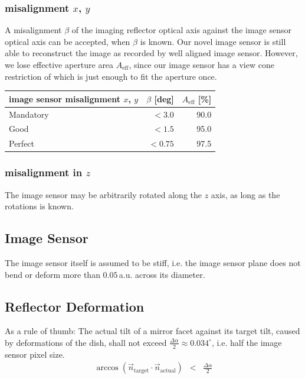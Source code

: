\documentclass[11pt,a4paper,oneside,titlepage]{article}
\begin{document}
\subsubsection{misalignment $x$, $y$}
%
A misalignment $\beta$ of the imaging reflector optical axis against the image sensor optical axis can be accepted, when $\beta$ is known.
%
Our novel image sensor is still able to reconstruct the image as recorded by well aligned image sensor.
%
However, we lose effective aperture area $A_\text{eff}$, since our image sensor has a view cone restriction of which is just enough to fit the aperture once.
%
%
\begin{table}[H]
    \begin{center}
        \begin{tabular}{lrr}
            image sensor misalignment $x$, $y$ & $\beta$ [deg] & $A_\text{eff}$ [\%]\\
            \toprule
            Mandatory & $< 3.0$ & 90.0\\
            Good      & $< 1.5$ & 95.0\\
            Perfect   & $< 0.75$ & 97.5\\
            \bottomrule
        \end{tabular}
    \end{center}
\end{table}
\subsubsection{misalignment in $z$}
%
The image sensor may be arbitrarily rotated along the $z$ axis, as long as the rotations is known.
\subsection{Image Sensor}
%
The image sensor itself is assumed to be stiff, i.e. the image sensor plane does not bend or deform more than $0.05\,$a.u. across its diameter.
\subsection{Reflector Deformation}
%
As a rule of thumb:
The actual tilt of a mirror facet against its target tilt, caused by deformations of the dish, shall not exceed \mbox{$\frac{\Delta \alpha}{2} \approx 0.034^\circ$}, i.e. half the image sensor pixel size.
%
\begin{eqnarray}
\arccos \left( \vec{n}_\text{target} \cdot \vec{n}_\text{actual} \right) &<& \frac{\Delta \alpha}{2}
\end{eqnarray}
\end{document}
